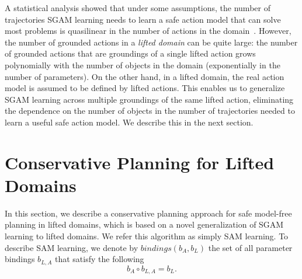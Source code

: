 \documentclass{article}
\newcommand{\tuple}[1]{\ensuremath{\left \langle #1 \right \rangle }}
\newcommand{\liftl}{L}
\newcommand{\lifta}{A}
\newcommand{\bindings}{\textit{bindings}}
\begin{document}
A statistical analysis showed that under some assumptions, the number of trajectories SGAM learning needs 
to learn a safe action model that can solve most problems is quasilinear in the number of actions in the domain~\cite{stern2017efficientAndSafe}. 
However, the number of grounded actions in a \emph{lifted domain} can be quite large: the number of grounded actions that are groundings of a single lifted action grows polynomially with the number of objects in the domain (exponentially in the number of parameters). 
On the other hand, in a lifted domain, the real action model is assumed to be defined by lifted actions. 
This enables us to generalize SGAM learning across multiple groundings of the same lifted action, eliminating the dependence on the number of objects in the number of trajectories needed to learn a useful safe action model. We describe this in the next section. 




\section{Conservative Planning for Lifted Domains}






In this section, we describe a conservative planning approach for safe model-free planning in lifted domains, 
which is based on a novel generalization of SGAM learning to lifted domains. We refer this algorithm as simply SAM learning. 
To describe SAM learning, 
we denote by $\bindings(b_\lifta, b_\liftl)$ the set of all 
parameter bindings $b_{\liftl, \lifta}$ that satisfy the following
\begin{equation}
    b_\lifta\circ b_{\liftl,\lifta} = b_\liftl.
    \label{eq:inferbind}
\end{equation}
\end{document}
